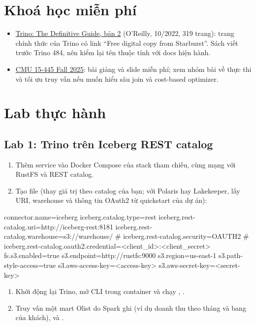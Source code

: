 \section{Khoá học miễn phí}
\begin{itemize}
  \item \href{https://trino.io/trino-the-definitive-guide.html}{Trino: The Definitive Guide, bản 2} (O'Reilly, 10/2022, 319 trang): trang chính thức của Trino có link ``Free digital copy from Starburst''. Sách viết trước Trino 484, nên kiểm lại tên thuộc tính với docs hiện hành.
  \item \href{https://15445.courses.cs.cmu.edu/fall2025/schedule.html}{CMU 15-445 Fall 2025}: bài giảng và slide miễn phí; xem nhóm bài về thực thi và tối ưu truy vấn nếu muốn hiểu sâu join và cost-based optimizer.
\end{itemize}

\section{Lab thực hành}

\subsection{Lab 1: Trino trên Iceberg REST catalog}
\begin{enumerate}
  \item Thêm service  vào Docker Compose của stack tham chiếu, cùng mạng với RustFS và REST catalog.
  \item Tạo file  (thay giá trị theo catalog của bạn; với Polaris hay Lakekeeper, lấy URI, warehouse và thông tin OAuth2 từ quickstart của dự án):
\end{enumerate}
\begin{codeblock}
connector.name=iceberg
iceberg.catalog.type=rest
iceberg.rest-catalog.uri=http://iceberg-rest:8181
iceberg.rest-catalog.warehouse=s3://warehouse/
# iceberg.rest-catalog.security=OAUTH2
# iceberg.rest-catalog.oauth2.credential=<client_id>:<client_secret>
fs.s3.enabled=true
s3.endpoint=http://rustfs:9000
s3.region=us-east-1
s3.path-style-access=true
s3.aws-access-key=<access-key>
s3.aws-secret-key=<secret-key>
\end{codeblock}
\begin{enumerate}[resume]
  \item Khởi động lại Trino, mở CLI trong container và chạy , .
  \item Truy vấn một mart Olist do Spark ghi (ví dụ doanh thu theo tháng và bang của khách), và .
\end{enumerate}


